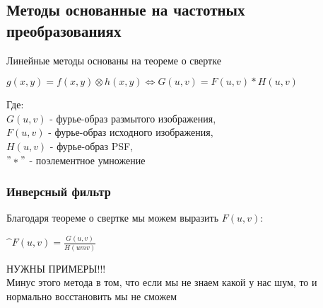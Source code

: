 \documentclass{article}
\begin{document}
	\subsection{Методы основанные на частотных преобразованиях}
	Линейные методы основаны на теореме о свертке
	\begin{center}
		$g(x, y) = f(x, y) \otimes h(x, y) \Leftrightarrow G(u, v)=F(u, v)*H(u, v)$
	\end{center}
	Где:\\
	$G(u, v)$ - фурье-образ размытого изображения,\\
	$F(u, v)$ - фурье-образ исходного изображения,\\
	$H(u, v)$ - фурье-образ PSF,\\
	$"*"$ - поэлементное умножение\\
	\subsubsection{Инверсный фильтр}
	Благодаря теореме о свертке мы можем выразить $F(u, v)$:
	\begin{center}
		$\^{F}(u, v)=\frac{G(u, v)}{H(um v)}$
	\end{center}
	НУЖНЫ ПРИМЕРЫ!!!\\
	Минус этого метода в том, что если мы не знаем какой у нас шум, то и нормально восстановить мы не сможем
\end{document}
